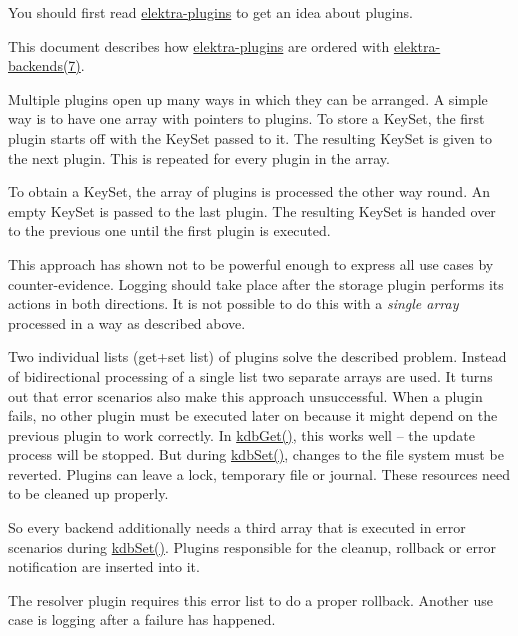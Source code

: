 You should first read \hyperlink{src_plugins_README_md}{elektra-\/plugins} to get an idea about plugins.

This document describes how \hyperlink{src_plugins_README_md}{elektra-\/plugins} are ordered with \hyperlink{doc_help_elektra-backends_md}{elektra-\/backends(7)}.

Multiple plugins open up many ways in which they can be arranged. A simple way is to have one array with pointers to plugins. To store a {\ttfamily Key\+Set}, the first plugin starts off with the {\ttfamily Key\+Set} passed to it. The resulting {\ttfamily Key\+Set} is given to the next plugin. This is repeated for every plugin in the array.

To obtain a {\ttfamily Key\+Set}, the array of plugins is processed the other way round. An empty {\ttfamily Key\+Set} is passed to the last plugin. The resulting {\ttfamily Key\+Set} is handed over to the previous one until the first plugin is executed.

This approach has shown not to be powerful enough to express all use cases by counter-\/evidence. Logging should take place after the storage plugin performs its actions in both directions. It is not possible to do this with a {\itshape single array} processed in a way as described above.

Two individual lists (get+set list) of plugins solve the described problem. Instead of bidirectional processing of a single list two separate arrays are used. It turns out that error scenarios also make this approach unsuccessful. When a plugin fails, no other plugin must be executed later on because it might depend on the previous plugin to work correctly. In {\ttfamily \hyperlink{group__kdb_ga28e385fd9cb7ccfe0b2f1ed2f62453a1}{kdb\+Get()}}, this works well -- the update process will be stopped. But during {\ttfamily \hyperlink{group__kdb_ga11436b058408f83d303ca5e996832bcf}{kdb\+Set()}}, changes to the file system must be reverted. Plugins can leave a lock, temporary file or journal. These resources need to be cleaned up properly.

So every backend additionally needs a third array that is executed in error scenarios during {\ttfamily \hyperlink{group__kdb_ga11436b058408f83d303ca5e996832bcf}{kdb\+Set()}}. Plugins responsible for the cleanup, rollback or error notification are inserted into it.

The resolver plugin requires this error list to do a proper rollback. Another use case is logging after a failure has happened.

